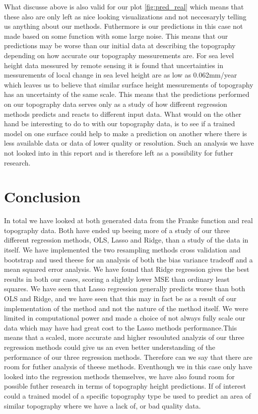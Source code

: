 \documentclass[12pt]{article}
\begin{document}
What discusse above is also valid for our plot \ref{fig:pred_real} which means that these also are only left as nice looking visualizations and not neccesaryly telling us anything about our methods. Futhermore is our predictions in this case not made based on some function with some large noise. This means that our predictions may be worse than our initial data at describing the topography depending on how accurate our topography messurements are. For sea level height data messured by remote sensing it is found that uncertainties in messurements of local change in sea level height are as low as 0.062mm/year \cite{sealevel} which leaves us to believe that similar surface height messurements of topography has an uncertainty of the same scale. This means that the predictions performed on our topography data serves only as a study of how different regression methods predicts and reacts to different input data. What would on the other hand be interesting to do to with our topography data, is to see if a trained model on one surface could help to make a prediction on another where there is less available data or data of lower quality or resolution. Such an analysis we have not looked into in this report and is therefore left as a possibility for futher research.

\section{Conclusion}
In total we have looked at both generated data from the Franke function and real topography data. Both have ended up beeing more of a study of our three different regression methods, OLS, Lasso and Ridge, than a study of the data in itself. We have implemented the two resampling methods cross validation and bootstrap and used theese for an analysis of both the bias variance tradeoff and a mean squared error analysis. We have found that Ridge regression gives the best results in both our cases, scoring a slightly lower MSE than ordinary least squares. We have seen that Lasso regression generally predicts worse than both OLS and Ridge, and we have seen that this may in fact be as a result of our implementation of the method and not the nature of the method itself. We were limited in computational power and made a choice of not always fully scale our data which may have had great cost to the Lasso methods performance.This means that a scaled, more accurate and higher resouluted analyzis of our three regression methods could give us an even better understanding of the performance of our three regression methods. Therefore can we say that there are  room for futher analysis of theese methods. Eventhough we in this case only have looked into the regression methods themselves, we have also found room for possible futher research in terms of topography height predictions. If of interest could a trained model of a specific topography type be used to predict an area of similar topography where we have a lack of, or bad quality data. 
\newpage
\printbibliography
\end{document}
